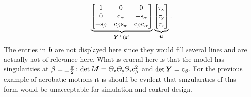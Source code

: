 \begin{multline}
 = \underbrace{\begin{bmatrix}
  1 & 0 & 0 \\
  0 & \mathrm{c}_{\alpha} & -\mathrm{s}_{\alpha} \\
  -\mathrm{s}_{\beta} & \mathrm{c}_{\beta} \mathrm{s}_{\alpha} & \mathrm{c}_{\beta} \mathrm{c}_{\alpha}
 \end{bmatrix}}_{\boldsymbol{Y}^\top(\boldsymbol{q})}
 \underbrace{\begin{bmatrix} \tau_{\mathsf{x}} \\ \tau_{\mathsf{y}} \\ \tau_{\mathsf{z}} \end{bmatrix}}_{\boldsymbol{u}}.
\end{multline}
The entries in $\boldsymbol{b}$ are not displayed here since they would fill several lines and are actually not of relevance here.
What is crucial here is that the model has singularities at $\beta=\pm\tfrac{\pi}{2}$: $\det\boldsymbol{M} = \varTheta_{\mathsf{x}}\varTheta_{\mathsf{y}}\varTheta_{\mathsf{z}}\mathrm{c}_{\beta}^2$ and $\det\boldsymbol{Y} = \mathrm{c}_{\beta}$.
For the previous example of aerobatic motions it is should be evident that singularities of this form would be unacceptable for simulation and control design. 


